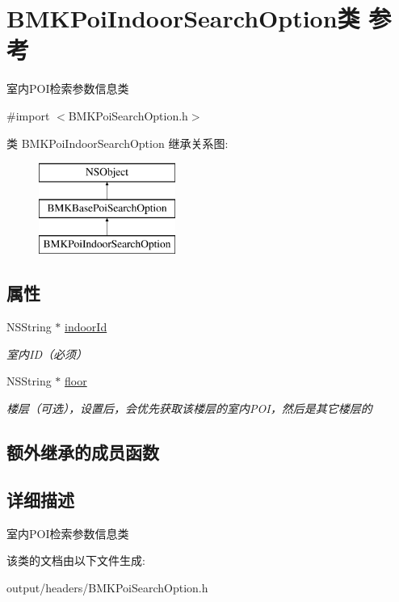 \hypertarget{interface_b_m_k_poi_indoor_search_option}{}\section{B\+M\+K\+Poi\+Indoor\+Search\+Option类 参考}
\label{interface_b_m_k_poi_indoor_search_option}


室内\+P\+O\+I检索参数信息类  




{\ttfamily \#import $<$B\+M\+K\+Poi\+Search\+Option.\+h$>$}

类 B\+M\+K\+Poi\+Indoor\+Search\+Option 继承关系图\+:\begin{figure}[H]
\begin{center}
\leavevmode
\includegraphics[height=3.000000cm]{interface_b_m_k_poi_indoor_search_option}
\end{center}
\end{figure}
\subsection*{属性}
\begin{DoxyCompactItemize}
\item 
\hypertarget{interface_b_m_k_poi_indoor_search_option_a3918c0b1eb2fdf4e4cd6b862452773d7}{}N\+S\+String $\ast$ \hyperlink{interface_b_m_k_poi_indoor_search_option_a3918c0b1eb2fdf4e4cd6b862452773d7}{indoor\+Id}\label{interface_b_m_k_poi_indoor_search_option_a3918c0b1eb2fdf4e4cd6b862452773d7}

\begin{DoxyCompactList}\small\item\em 室内\+I\+D（必须） \end{DoxyCompactList}\item 
\hypertarget{interface_b_m_k_poi_indoor_search_option_a12dac04d322415d04c47e36213aa1b1e}{}N\+S\+String $\ast$ \hyperlink{interface_b_m_k_poi_indoor_search_option_a12dac04d322415d04c47e36213aa1b1e}{floor}\label{interface_b_m_k_poi_indoor_search_option_a12dac04d322415d04c47e36213aa1b1e}

\begin{DoxyCompactList}\small\item\em 楼层（可选），设置后，会优先获取该楼层的室内\+P\+O\+I，然后是其它楼层的 \end{DoxyCompactList}\end{DoxyCompactItemize}
\subsection*{额外继承的成员函数}


\subsection{详细描述}
室内\+P\+O\+I检索参数信息类 

该类的文档由以下文件生成\+:\begin{DoxyCompactItemize}
\item 
output/headers/B\+M\+K\+Poi\+Search\+Option.\+h\end{DoxyCompactItemize}
